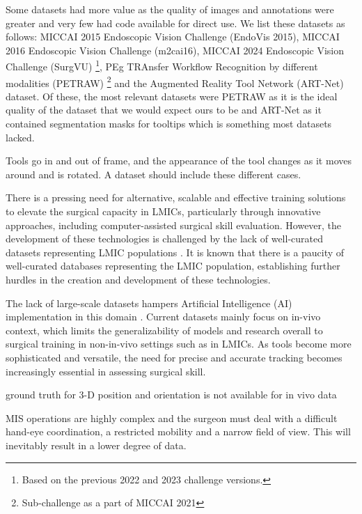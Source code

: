 Some datasets had more value as the quality of images and annotations were greater and very few had code available for direct use. We list these datasets as follows: MICCAI 2015 Endoscopic Vision Challenge (EndoVis 2015), MICCAI 2016 Endoscopic Vision Challenge (m2cai16), MICCAI 2024 Endoscopic Vision Challenge (SurgVU) \footnote{Based on the previous 2022 and 2023 challenge versions.}, PEg TRAnsfer Workflow Recognition by different modalities (PETRAW) \footnote{Sub-challenge as a part of MICCAI 2021} and the Augmented Reality Tool Network (ART-Net) dataset. Of these, the most relevant datasets were PETRAW as it is the ideal quality of the dataset that we would expect ours to be and ART-Net as it contained segmentation masks for tooltips which is something most datasets lacked.

Tools go in and out of frame, and the appearance of the tool changes as it moves around and is rotated. A dataset should include these different cases.

There is a pressing need for alternative, scalable and effective training solutions to elevate the surgical capacity in LMICs, particularly through innovative approaches, including computer-assisted surgical skill evaluation. However, the development of these technologies is challenged by the lack of well-curated datasets representing LMIC populations \cite{maier-hein_surgical_2022}. It is known that there is a paucity of well-curated databases \cite{organization_health_2016} representing the LMIC population, establishing further hurdles in the creation and development of these technologies. 

The lack of large-scale datasets hampers Artificial Intelligence (AI) implementation in this domain \cite{nwoye_cholectrack20_2023}. Current datasets mainly focus on in-vivo context, which limits the generalizability of models and research overall to surgical training in non-in-vivo settings such as in LMICs. As tools become more sophisticated and versatile, the need for precise and accurate tracking becomes increasingly essential in assessing surgical skill.

ground truth for 3-D position and orientation is not available for in vivo data 

MIS operations are highly complex and the surgeon must deal with a difficult hand-eye coordination, a restricted mobility and a narrow field of view. This will inevitably result in a lower degree of data.

